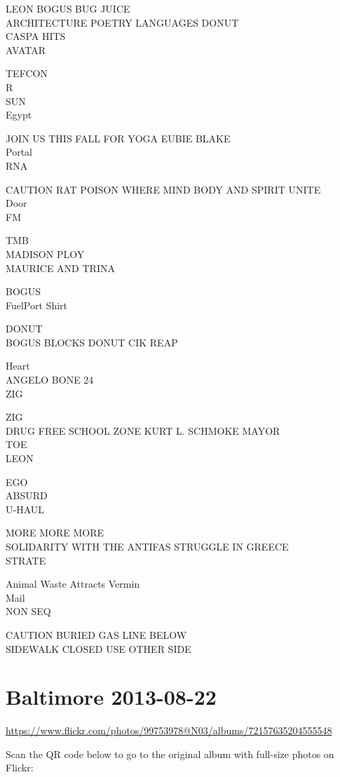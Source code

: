\documentclass[10pt,letterpaper]{article}
\begin{document}
LEON BOGUS BUG JUICE\\
ARCHITECTURE POETRY LANGUAGES DONUT\\
CASPA HITS\\
AVATAR

TEFCON\\
R\\
SUN\\
Egypt

JOIN US THIS FALL FOR YOGA EUBIE BLAKE\\
Portal\\
RNA

CAUTION RAT POISON WHERE MIND BODY AND SPIRIT UNITE\\
Door\\
FM

TMB\\
MADISON PLOY\\
MAURICE AND TRINA

BOGUS\\
FuelPort Shirt

DONUT\\
BOGUS BLOCKS DONUT CIK REAP

Heart\\
ANGELO BONE 24\\
ZIG

ZIG\\
DRUG FREE SCHOOL ZONE KURT L. SCHMOKE MAYOR\\
TOE\\
LEON

EGO\\
ABSURD\\
U{-}HAUL

MORE MORE MORE\\
SOLIDARITY WITH THE ANTIFAS STRUGGLE IN GREECE\\
STRATE

Animal Waste Attracts Vermin\\
Mail\\
NON SEQ

CAUTION BURIED GAS LINE BELOW\\
SIDEWALK CLOSED USE OTHER SIDE


\section*{Baltimore 2013-08-22}

\url{https://www.flickr.com/photos/99753978@N03/albums/72157635204555548}

Scan the QR code below to go to the original album with full-size photos on Flickr:
\end{document}
